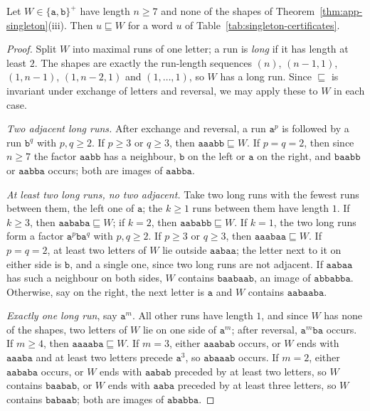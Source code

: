 \begin{lemma}
\label{lem:app-singleton-runs}
Let $W\in\{\mathtt a,\mathtt b\}^+$ have length $n\ge7$ and none of the shapes of
Theorem~\ref{thm:app-singleton}\textup{(iii)}.  Then $u\sqsubseteq W$ for a word $u$
of Table~\ref{tab:singleton-certificates}.
\end{lemma}

\begin{proof}
Split $W$ into maximal runs of one letter; a run is \emph{long} if it has length at
least $2$.  The shapes are exactly the run-length sequences $(n)$, $(n-1,1)$,
$(1,n-1)$, $(1,n-2,1)$ and $(1,\ldots,1)$, so $W$ has a long run.  Since
$\sqsubseteq$ is invariant under exchange of letters and reversal, we may apply
these to $W$ in each case.

\emph{Two adjacent long runs.}  After exchange and reversal, a run $\mathtt a^p$ is
followed by a run $\mathtt b^q$ with $p,q\ge2$.  If $p\ge3$ or $q\ge3$, then
$\mathtt{aaabb}\sqsubseteq W$.  If $p=q=2$, then since $n\ge7$ the factor
$\mathtt{aabb}$ has a neighbour, $\mathtt b$ on the left or $\mathtt a$ on the right,
and $\mathtt{baabb}$ or $\mathtt{aabba}$ occurs; both are images of $\mathtt{aabba}$.

\emph{At least two long runs, no two adjacent.}  Take two long runs with the
fewest runs between them, the left one of $\mathtt a$; the $k\ge1$ runs between them
have length $1$.  If $k\ge3$,
then $\mathtt{aababa}\sqsubseteq W$; if $k=2$, then $\mathtt{aababb}\sqsubseteq W$.
If $k=1$, the two long runs form a factor
$\mathtt a^p\mathtt b\mathtt a^q$ with $p,q\ge2$.  If $p\ge3$ or $q\ge3$, then
$\mathtt{aaabaa}\sqsubseteq W$.  If $p=q=2$, at least two letters of $W$ lie
outside $\mathtt{aabaa}$; the letter next to it on either side is $\mathtt b$, and a
single one, since two long runs are not adjacent.  If $\mathtt{aabaa}$ has such a
neighbour on both sides, $W$ contains $\mathtt{baabaab}$, an image of
$\mathtt{abbabba}$.  Otherwise, say on the right, the next letter is $\mathtt a$ and
$W$ contains $\mathtt{aabaaba}$.

\emph{Exactly one long run}, say $\mathtt a^m$.  All other runs have length $1$, and since
$W$ has none of the shapes, two letters of $W$ lie on one side of $\mathtt a^m$; after
reversal, $\mathtt a^m\mathtt{ba}$ occurs.  If $m\ge4$, then
$\mathtt{aaaaba}\sqsubseteq W$.  If $m=3$, either $\mathtt{aaabab}$ occurs, or $W$
ends with $\mathtt{aaaba}$ and at least two letters precede $\mathtt a^3$, so
$\mathtt{abaaab}$ occurs.  If $m=2$, either $\mathtt{aababa}$ occurs, or $W$ ends
with $\mathtt{aabab}$ preceded by at least two letters, so $W$ contains
$\mathtt{baabab}$, or $W$ ends with $\mathtt{aaba}$ preceded by at least three
letters, so $W$ contains $\mathtt{babaab}$; both are images of
$\mathtt{ababba}$.
\end{proof}

